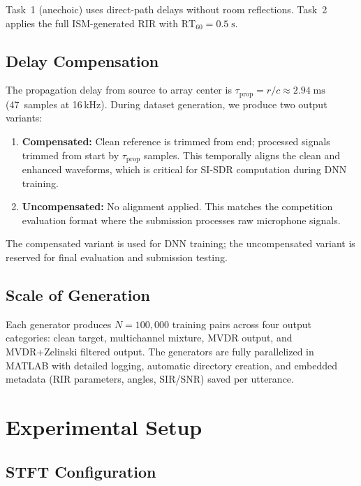 \documentclass[a4paper]{article}
\begin{document}
Task~1 (anechoic) uses direct-path delays without room reflections.  Task~2
applies the full ISM-generated RIR with $\text{RT}_{60}=0.5\;\text{s}$.

\subsection{Delay Compensation}
\label{sec:delay}

The propagation delay from source to array center is
$\tau_\text{prop}=r/c \approx 2.94\;\text{ms}$ (47~samples at 16\,kHz).
During dataset generation, we produce two output variants:
\begin{enumerate}\itemsep0pt
\item \textbf{Compensated:} Clean reference is trimmed from end; processed
      signals trimmed from start by $\tau_\text{prop}$ samples.  This
      temporally aligns the clean and enhanced waveforms, which is critical
      for SI-SDR computation during DNN training.
\item \textbf{Uncompensated:} No alignment applied.  This matches the
      competition evaluation format where the submission processes raw
      microphone signals.
\end{enumerate}

The compensated variant is used for DNN training; the uncompensated variant
is reserved for final evaluation and submission testing.

\subsection{Scale of Generation}
\label{sec:scale}

Each generator produces $N=100{,}000$ training pairs across four output
categories: clean target, multichannel mixture, MVDR output, and
MVDR+Zelinski filtered output.  The generators are fully parallelized in
MATLAB with detailed logging, automatic directory creation, and embedded
metadata (RIR parameters, angles, SIR/SNR) saved per utterance.

\section{Experimental Setup}
\label{sec:experiments}

\subsection{STFT Configuration}
\label{sec:stft}
\end{document}
